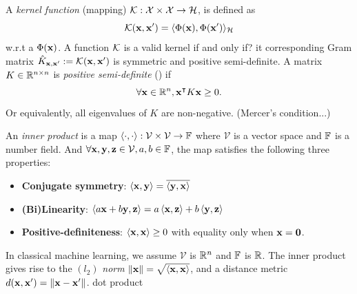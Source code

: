 \begin{definition}\label{def:kernel}
	A \emph{kernel function} (mapping) $\mathcal{K}: \mathcal{X}\times\mathcal{X}\to\mathcal{H}$,
	is defined as 
	\begin{equation}
		\mathcal{K}(\vb{x},\vb{x}') = \langle \Phi(\vb{x}),\Phi(\vb{x}') \rangle_{\mathcal{H}}
		\label{eq:kernel_classical}
	\end{equation}
	w.r.t a  $\Phi(\vb{x})$.
	A function $\mathcal{K}$ is a valid kernel if and only if? it corresponding Gram matrix $\hat{K}_{\vb{x},\vb{x}'}:=\mathcal{K}(\vb{x},\vb{x}')$ is symmetric and positive semi-definite.
	A matrix $K\in\mathbb{R}^{n\times n}$ is \emph{positive semi-definite} (\psd) if
	\begin{equation}
		\forall \vb{x} \in \mathbb{R}^n, \vb{x}^\intercal K \vb{x} \ge 0.
	\end{equation}
	Or equivalently, all eigenvalues of $K$ are non-negative. (Mercer's condition...)
\end{definition}
\begin{definition}\label{def:inner_product}
	An \emph{inner product} is a map
	$\expval{\cdot,\cdot}: \mathcal{V} \times \mathcal{V} \to \mathbb{F}$
	where $\mathcal{V}$ is a vector space and $\mathbb{F}$ is a number field.
	And $\forall \vb{x},\vb{y},\vb{z}\in \mathcal{V},a,b\in\mathbb{F}$, 
	the map satisfies the following three properties:
	\begin{itemize}
		\item \textbf{Conjugate symmetry}:
		$\expval{\vb{x},\vb{y}}=\overline{\expval{\vb{y},\vb{x}}}$
		\item \textbf{(Bi)Linearity}:
		$\expval{a\vb{x}+b\vb{y},\vb{z}}=a\expval{\vb{x},\vb{z}}+b\expval{\vb{y},\vb{z}}$
		\item \textbf{Positive-definiteness}:
		$\expval{\vb{x},\vb{x}}\ge 0$ with equality only when $\vb{x}=\vb{0}$.
	\end{itemize}
	In classical machine learning, we assume $\mathcal{V}$ is $\mathbb{R}^n$ and $\mathbb{F}$ is $\mathbb{R}$.
	The inner product gives rise to the $(l_2)$ \emph{norm} $\norm{\vb{x}}=\sqrt{\expval{\vb{x},\vb{x}}}$,
	and a distance metric $d(\vb{x},\vb{x}')=\norm{\vb{x}-\vb{x}'}$.
	dot product
\end{definition}
